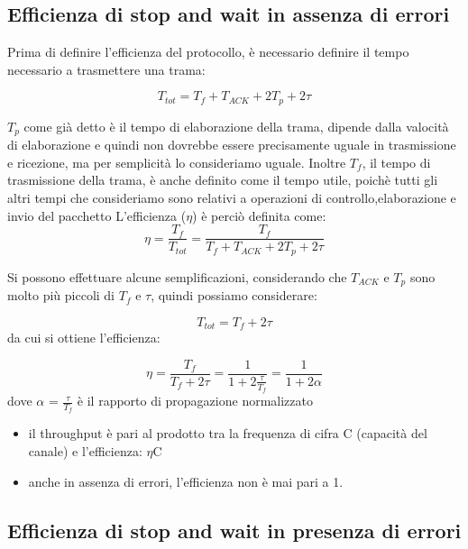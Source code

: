 \subsection{Efficienza di stop and wait in assenza di errori}

Prima di definire l'efficienza del protocollo, è necessario definire il tempo necessario a trasmettere una trama:

\begin{equation}
T_{tot} = T_f + T_{ACK} + 2T_p + 2\tau
\end{equation}

$T_p$ come già detto è il tempo di elaborazione della trama, dipende dalla valocità di elaborazione e quindi non dovrebbe essere precisamente uguale in trasmissione e ricezione, ma per semplicità lo consideriamo uguale.
Inoltre $T_f$, il tempo di trasmissione della trama, è anche definito come il tempo utile, poichè tutti gli altri tempi che consideriamo sono relativi a operazioni di controllo,elaborazione e invio del pacchetto
L'efficienza ($\eta$) è perciò definita come:
\begin{equation}
\eta = \frac{T_f}{T_{tot}} = \frac{T_f}{T_f + T_{ACK} + 2T_p + 2\tau}
\end{equation}

Si possono effettuare alcune semplificazioni, considerando che $T_{ACK}$ e $T_p$ sono molto più piccoli di $T_f$ e $\tau$, quindi possiamo considerare:

\begin{equation}
T_{tot} = T_f + 2\tau
\end{equation}
da cui si ottiene l'efficienza:

\begin{equation}
\eta = \frac{T_f}{T_f + 2\tau} = \frac{1}{1 + 2\frac{\tau}{T_f}} = \frac{1}{1 + 2\alpha} 
\end{equation}
dove $\alpha$ = $\frac{\tau}{T_f}$ è il rapporto di propagazione normalizzato

\begin{itemize}
    \item il throughput è pari al prodotto tra la frequenza di cifra C (capacità del canale) e l'efficienza: $\eta$C
    \item anche in assenza di errori, l'efficienza non è mai pari a 1.
\end{itemize}

\newpage

\subsection{Efficienza di stop and wait in presenza di errori}

